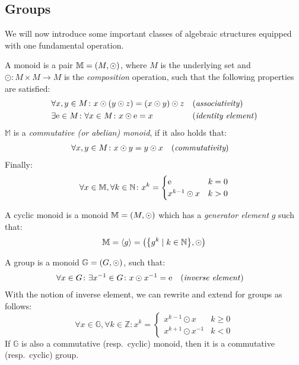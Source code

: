 \subsection{Groups}
We will now introduce some important classes of algebraic structures equipped with one fundamental 
operation. 
\begin{definition}[Monoid]
  A monoid is a pair \(\mathbb{M} = \Tuple{M, \odot} \), where \(M\) is the 
  underlying set and \(\odot\colon M \times M \to M\) is the \emph{composition} 
  operation, such that the following properties are satisfied: 
  \begin{align*}
    & \forall x,y \in M\colon x \odot \Parens*{y \odot z} = \Parens*{x \odot y} \odot z
      && \textnormal{(\emph{associativity})} \\
    & \exists \algid \in M\colon \forall x \in M\colon x \odot \algid = x
      && \textnormal{(\emph{identity element})}
  \end{align*}
  \(\mathbb{M}\) is a \emph{commutative (or abelian) monoid}, if it also holds that:
  \begin{align*}
    & \forall x,y \in M\colon x \odot y = y \odot x && (\emph{commutativity})
  \end{align*}
  Finally:
  \begin{equation}\label{eq:exponentiation}    
    \forall x \in \mathbb{M}, \forall k \in \mathbb{N}\colon x^{k} = 
    \begin{cases}
      \algid & k = 0 \\
      x^{k-1} \odot x & k > 0
    \end{cases}
  \end{equation}
\end{definition}

\begin{definition}
  A cyclic monoid is a monoid \(\mathbb{M} = \Tuple{M, \odot}\) which has a 
  \emph{generator element} \(g\) such that:
  \[\mathbb{M} = \gengroup{g} = \Tuple{\Set{g^k \mid k \in \mathbb{N}}, \odot} \]
\end{definition}

\begin{definition}[Group]
  A group is a monoid \(\mathbb{G} = \Tuple{G, \odot} \), such that: 
  \begin{align*}    
    & \forall x \in G\colon \exists x^{-1} \in G\colon x \odot x^{-1} = \algid
    && \textnormal{(\emph{inverse element})}
  \end{align*}
  With the notion of inverse element, we can rewrite and extend  
  for groups as follows:
  \[
    \forall x \in \mathbb{G},\forall k \in \mathbb{Z}\colon x^k =
    \begin{cases}
      x^{k-1} \odot x & k \ge 0 \\
      x^{k+1} \odot x^{-1} & k < 0
    \end{cases}
  \]
  If \(\mathbb{G}\) is also a commutative (resp.\ cyclic) monoid, then it is a 
  commutative (resp.\ cyclic) group.
\end{definition}

